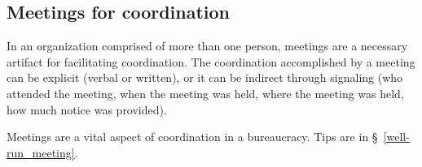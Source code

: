\subsection{Meetings for coordination\label{sec:meetings-for-coordination}}
In an organization comprised of more than one person, meetings are a necessary artifact for facilitating coordination. The coordination accomplished by a meeting can be explicit (verbal or written), or it can be indirect through signaling (who attended the meeting, when the meeting was held, where the meeting was held, how much notice was provided). 

Meetings are a vital aspect of coordination in a bureaucracy. Tips are in \S~\ref{well-run_meeting}.